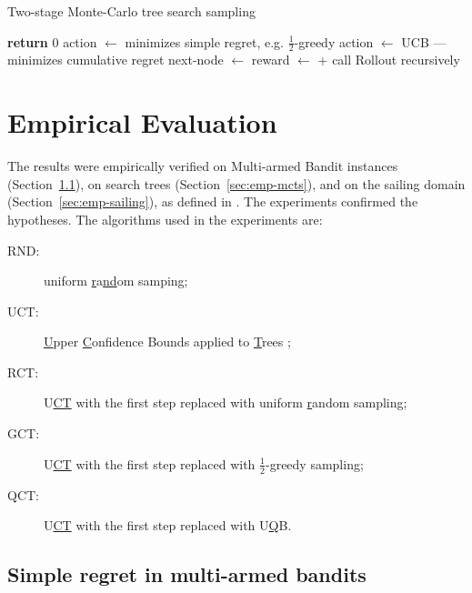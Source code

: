 \documentclass{article}
\begin{document}
\begin{algorithm}[t]
\caption{Two-stage Monte-Carlo tree search sampling}
\label{alg:two-stage-mcts}
\begin{algorithmic}[1]
    \State \textbf{return} 0
  \Else
      \State action $\gets$  \Comment minimizes simple regret, e.g. $\frac 1 2$-greedy
    \Else
      \State action $\gets$  \Comment  UCB --- minimizes cumulative regret
    \EndIf
    \State next-node $\gets$ 
    \State reward $\gets$ 
    \State \hspace{4em} +  \Comment call {\sc Rollout} recursively
    \State {}
  \EndIf
\EndProcedure
\end{algorithmic}
\end{algorithm}

\section{Empirical Evaluation}
\label{sec:emp}

The results were empirically verified on Multi-armed Bandit instances
(Section~\ref{sec:emp-mab}), on search trees
(Section~\ref{sec:emp-mcts}), and on the sailing domain
(Section~\ref{sec:emp-sailing}), as defined in \cite{Kocsis.uct}. The
experiments confirmed the hypotheses. The algorithms used in the
experiments are:
\begin{description}
\item[RND:] uniform \underline{r}a\underline{nd}om samping;
\item[UCT:] \underline{U}pper \underline{C}onfidence Bounds applied to
  \underline{T}rees \cite{Kocsis.uct};
\item[RCT:] U\underline{CT} with the first step replaced with uniform
  \underline{r}andom sampling;
\item[GCT:] U\underline{CT} with the first step
  replaced with $\frac 1 2$-\underline{g}reedy sampling;
\item[QCT:] U\underline{CT} with the first step
  replaced with U\underline{Q}B.
\end{description}

\subsection{Simple regret in multi-armed bandits}
\label{sec:emp-mab}
\end{document}
